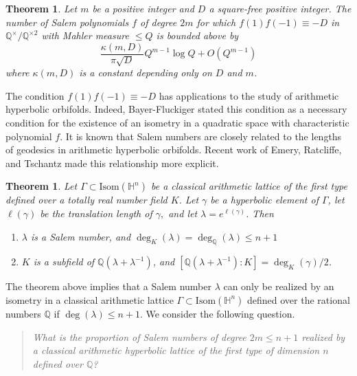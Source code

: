 \documentclass[12pt]{amsart}
\renewcommand{\H}{\mathbb{H}}
\newcommand{\Q}{\mathbb{Q}}
\theoremstyle{plain}
\newtheorem{theorem}{Theorem}[section]
\newtheorem{mainthm}{Theorem}
\begin{document}
\begin{mainthm} \label{ThmSalemCount}
Let $m$ be a positive integer and $D$ a square-free positive integer. The number of Salem polynomials $f$ of degree $2m$ for which $f(1)f(-1)\equiv -D$ in $\Q^{\times}/\Q^{\times 2}$ with Mahler measure $\leq Q$ is bounded above by
\[
    \frac{\kappa(m,D)}{\pi\sqrt{D}}Q^{m-1}\log Q + O(Q^{m-1})
\]
where $\kappa(m,D)$ is a constant depending only on $D$ and $m$.
\end{mainthm}

The condition $f(1)f(-1)\equiv -D$ has applications to the study of arithmetic hyperbolic orbifolds. Indeed, Bayer-Fluckiger \cite{Bayer-Fluckinger} stated this condition as a necessary condition for the existence of an isometry in a quadratic space with characteristic polynomial $f$. 
It is known that Salem numbers are closely related to the lengths of geodesics in arithmetic hyperbolic orbifolds.
Recent work of Emery, Ratcliffe, and Tschantz made this relationship more explicit.

\begin{theorem}\cite[Theorem 1.1]{EmeryRatcliffeTschantz}\label{th:ERT 1.1}
    Let $\Gamma\subset\mathrm{Isom}(\H^n)$ be a classical arithmetic lattice of the first type defined over a totally real number field $K$. Let $\gamma$ be a hyperbolic element of $\Gamma$, let $\ell(\gamma)$ be the translation length of $\gamma,$ and let $\lambda=e^{\ell(\gamma)}$. Then 
    \begin{enumerate}
        \item $\lambda$ is a Salem number, and $\deg_{K}(\lambda)=\deg_{\Q}(\lambda)\leq n+1$

        \item $K$ is a subfield of $\Q(\lambda +\lambda^{-1})$, and $[\Q(\lambda+\lambda^{-1}):K]=\deg_K(\gamma)/2$.  
    \end{enumerate}
\end{theorem}

The theorem above implies that a Salem number $\lambda$ can only be realized by an isometry in a classical arithmetic lattice $\Gamma\subset\mathrm{Isom}(\H^n)$ defined over the rational numbers $\Q$ if $\deg(\lambda)\leq n+1$. We consider the following question. 
\begin{quote}\itshape
    What is the proportion of Salem numbers of degree $2m\leq n+1$ realized by a classical arithmetic hyperbolic lattice of the first type of dimension $n$ defined over $\Q$?
\end{quote}
\end{document}
